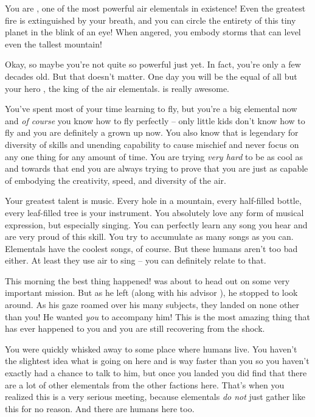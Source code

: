 \documentclass[char]{elementals}
\begin{document}
\name{\cMiniAir{}}

You are \cMiniAir{\intro}, one of the most powerful air elementals in existence! Even the greatest fire is extinguished by your breath, and you can circle the entirety of this tiny planet in the blink of an eye! When angered, you embody storms that can level even the tallest mountain!

Okay, so maybe you're not quite so powerful just yet. In fact, you're only a few decades old. But that doesn't matter. One day you will be the equal of all but your hero \cKing{\intro}, the king of the air elementals. \cKing{\They} is really awesome.

You've spent most of your time learning to fly, but you're a big elemental now and \emph{of course} you know how to fly perfectly -- only little kids don't know how to fly and you are definitely a grown up now. You also know that \cKing{} is legendary for \cKing{\their} diversity of skills and unending capability to cause mischief and never focus on any one thing for any amount of time. You are trying \emph{very hard} to be as cool as \cKing{} and towards that end you are always trying to prove that you are just as capable of embodying the creativity, speed, and diversity of the air.

Your greatest talent is music. Every hole in a mountain, every half-filled bottle, every leaf-filled tree is your instrument. You absolutely love any form of musical expression, but especially singing. You can perfectly learn any song you hear and are very proud of this skill. You try to accumulate as many songs as you can. Elementals have the coolest songs, of course. But these humans aren't too bad either. At least they use air to sing -- you can definitely relate to that.

This morning the best thing happened! \cKing{} was about to head out on some very important mission. But as he left (along with his advisor \cNaturalist{}), he stopped to look around. As his gaze roamed over his many subjects, they landed on none other than you! He wanted \emph{you} to accompany him! This is the most amazing thing that has ever happened to you and you are still recovering from the shock.

You were quickly whisked away to some place where humans live. You haven't the slightest idea what is going on here and \cKing{} is way faster than you so you haven't exactly had a chance to talk to him, but once you landed you did find that there are a lot of other elementals from the other factions here. That's when you realized this is a very serious meeting, because elementals \emph{do not} just gather like this for no reason. And there are humans here too.
\end{document}

